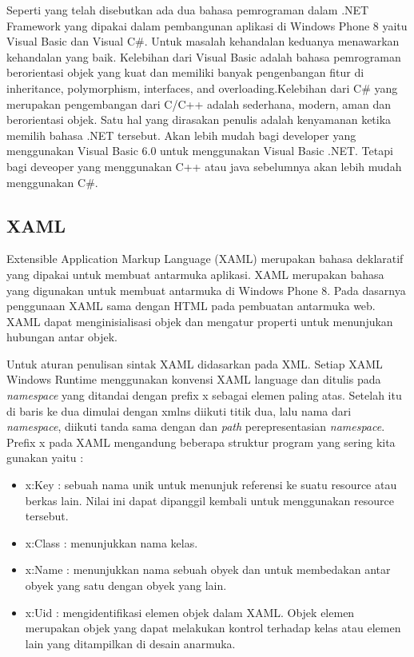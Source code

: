 \hspace{0.5cm} Seperti yang telah disebutkan ada dua bahasa pemrograman dalam .NET Framework yang dipakai dalam pembangunan aplikasi di Windows Phone 8 yaitu Visual Basic dan Visual C\#. Untuk masalah kehandalan keduanya menawarkan kehandalan yang baik. Kelebihan dari Visual Basic adalah bahasa pemrograman berorientasi objek yang kuat dan memiliki banyak pengenbangan fitur di inheritance, polymorphism, interfaces, and overloading\cite{MSDN}.Kelebihan dari C\# yang merupakan pengembangan dari C/C++ adalah sederhana, modern, aman dan berorientasi objek\cite{MSDN}. Satu hal yang dirasakan penulis adalah kenyamanan ketika memilih bahasa .NET tersebut. Akan lebih mudah bagi developer yang menggunakan Visual Basic 6.0  untuk menggunakan Visual Basic .NET. Tetapi bagi  deveoper yang menggunakan C++ atau java sebelumnya akan lebih mudah menggunakan C\#.

\subsection{XAML}
\label{subsec:XAML}
\hspace{0.5cm} Extensible Application Markup Language (XAML) merupakan bahasa deklaratif yang dipakai untuk membuat antarmuka aplikasi. XAML merupakan bahasa yang digunakan untuk membuat antarmuka di Windows Phone 8. Pada dasarnya penggunaan XAML sama dengan HTML pada pembuatan antarmuka web. XAML dapat menginisialisasi objek dan mengatur properti untuk menunjukan hubungan antar objek.

\hspace{0.5cm} Untuk aturan penulisan sintak XAML didasarkan pada XML. Setiap XAML Windows Runtime menggunakan konvensi XAML language dan ditulis pada \textit{namespace} yang ditandai dengan prefix x sebagai elemen paling atas. Setelah itu di baris ke dua dimulai dengan xmlns diikuti titik dua, lalu nama dari \textit{namespace}, diikuti tanda sama dengan dan \textit{path} perepresentasian \textit{namespace}.
Prefix x pada XAML mengandung beberapa struktur program yang sering kita gunakan yaitu :
\begin{itemize}
	\item x:Key : sebuah nama unik untuk menunjuk referensi ke suatu resource atau berkas lain. Nilai ini dapat dipanggil kembali untuk menggunakan resource tersebut.
	\item x:Class : menunjukkan nama kelas.
	\item x:Name : menunjukkan nama sebuah obyek dan untuk membedakan antar obyek yang satu dengan obyek yang lain.
	\item x:Uid : mengidentifikasi elemen objek dalam XAML. Objek elemen merupakan objek yang dapat melakukan kontrol terhadap kelas atau elemen lain yang ditampilkan di desain anarmuka.
\end{itemize}	


